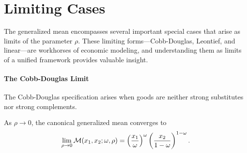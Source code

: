 \section{Limiting Cases}
\label{sec:limiting-cases}

The generalized mean encompasses several important special cases that arise as limits of the parameter $\rho$. These limiting forms---Cobb-Douglas, Leontief, and linear---are workhorses of economic modeling, and understanding them as limits of a unified framework provides valuable insight.

\paragraph{The Cobb-Douglas Limit}

The Cobb-Douglas specification arises when goods are neither strong substitutes nor strong complements.

\begin{proposition}
\label{prop:cobb-douglas}
As $\rho \to 0$, the canonical generalized mean converges to
\begin{equation}
\label{eq:cobb-douglas}
\lim_{\rho \to 0} \mathcal{M}(x_1, x_2; \omega, \rho) = \left( \frac{x_1}{\omega} \right)^\omega \left( \frac{x_2}{1-\omega} \right)^{1-\omega}.
\end{equation}
\end{proposition}

